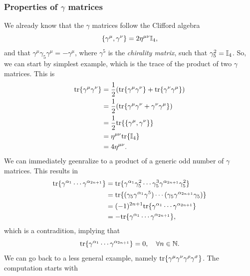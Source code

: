 \subsubsection{Properties of \texorpdfstring{$\gamma$}{gamma} matrices}
We already know that the $\gamma$ matrices follow the Clifford algebra
\begin{equation}
    \{\gamma^\mu,\gamma^\nu\} = 2\eta^{\mu\nu}\mathbb{I}_4,
\end{equation}
and that $\gamma^\mu\gamma_5\gamma^\mu = -\gamma^\mu$, where $\gamma^5$ is the \emph{chirality matrix}, such that $\gamma_5^2 = \mathbb{I}_4$. So, we can start by simplest example, which is the trace of the product of two $\gamma$ matrices. This is 
\begin{equation}
    \begin{split}
        \mathrm{tr}\{\gamma^\mu\gamma^\nu\} &= \frac{1}{2}(\mathrm{tr}\{\gamma^\mu\gamma^\nu\} + \mathrm{tr}\{\gamma^\nu\gamma^\mu\}) \\
        &= \frac{1}{2}(\mathrm{tr}\{\gamma^\mu\gamma^\nu + \gamma^\nu\gamma^\mu\}) \\
        &= \frac{1}{2}\mathrm{tr}\{\{\gamma^\mu,\gamma^\nu\}\} \\
        &= \eta^{\mu\nu}\mathrm{tr}\{\mathbb{I}_4\} \\
        &= 4\eta^{\mu\nu}.
    \end{split}
\end{equation} 
We can immediately geenralize to a product of a generic odd number of $\gamma$ matrices. This results in
\begin{equation}
    \begin{split}
        \mathrm{tr}\{\gamma^{\alpha_1}\cdots\gamma^{\alpha_{2n + 1}}\} &= \mathrm{tr}\{\gamma^{\alpha_1}\gamma_5^2\cdots\gamma_5^3\gamma^{\alpha_{2n + 1}}\gamma_5^2\} \\
        &= \mathrm{tr}\{(\gamma_5\gamma^{\alpha_1}\gamma^5)\cdots(\gamma_5\gamma^{\alpha_{2n + 1}}\gamma_5)\} \\
        &= (-1)^{2n + 1}\mathrm{tr}\{\gamma^{\alpha_1}\cdots\gamma^{\alpha_{2n + 1}}\} \\
        &= -\mathrm{tr}\{\gamma^{\alpha_1}\cdots\gamma^{\alpha_{2n + 1}}\},
    \end{split}
\end{equation}
which is a contradition, implying that 
\begin{equation}
    \mathrm{tr}\{\gamma^{\alpha_1}\cdots\gamma^{\alpha_{2n + 1}}\} = 0,\quad \forall n \in \mathbb{N}.
\end{equation}
We can go back to a less general example, namely $\mathrm{tr}\{\gamma^\mu\gamma^\nu\gamma^\rho\gamma^\sigma\}$. The computation starts with 
